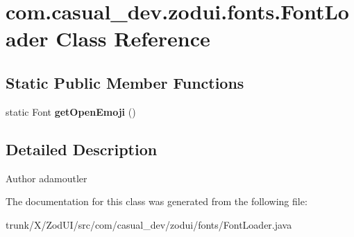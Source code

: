 \hypertarget{classcom_1_1casual__dev_1_1zodui_1_1fonts_1_1_font_loader}{\section{com.\-casual\-\_\-dev.\-zodui.\-fonts.\-Font\-Loader Class Reference}
\label{classcom_1_1casual__dev_1_1zodui_1_1fonts_1_1_font_loader}
}
\subsection*{Static Public Member Functions}
\begin{DoxyCompactItemize}
\item 
\hypertarget{classcom_1_1casual__dev_1_1zodui_1_1fonts_1_1_font_loader_a29509ab3f8154b1196264749cefcf396}{static Font {\bfseries get\-Open\-Emoji} ()}\label{classcom_1_1casual__dev_1_1zodui_1_1fonts_1_1_font_loader_a29509ab3f8154b1196264749cefcf396}

\end{DoxyCompactItemize}


\subsection{Detailed Description}
\begin{DoxyAuthor}{Author}
adamoutler 
\end{DoxyAuthor}


The documentation for this class was generated from the following file\-:\begin{DoxyCompactItemize}
\item 
trunk/\-X/\-Zod\-U\-I/src/com/casual\-\_\-dev/zodui/fonts/Font\-Loader.\-java\end{DoxyCompactItemize}
